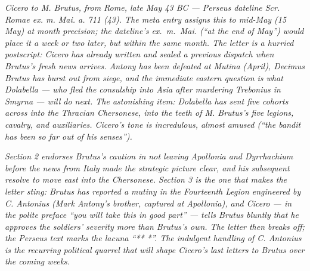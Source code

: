 
\textit{Cicero to M. Brutus, from Rome, late May 43 BC ---
Perseus dateline \textit{Scr. Romae ex. m. Mai. a. 711 (43)}.
The meta entry assigns this to mid-May (15 May) at month
precision; the dateline's \textit{ex.~m.~Mai.} (``at the end
of May'') would place it a week or two later, but within
the same month. The letter is a hurried postscript: Cicero
has already written and sealed a previous dispatch when
Brutus's fresh news arrives. Antony has been defeated at
Mutina (April), Decimus Brutus has burst out from siege,
and the immediate eastern question is what Dolabella ---
who fled the consulship into Asia after murdering Trebonius
in Smyrna --- will do next. The astonishing item: Dolabella
has sent five cohorts across into the Thracian Chersonese,
into the teeth of M. Brutus's five legions, cavalry, and
auxiliaries. Cicero's tone is incredulous, almost amused
(``the bandit has been so far out of his senses'').}

\textit{Section 2 endorses Brutus's caution in not leaving
Apollonia and Dyrrhachium before the news from Italy made
the strategic picture clear, and his subsequent resolve to
move east into the Chersonese. Section 3 is the one that
makes the letter sting: Brutus has reported a mutiny in
the Fourteenth Legion engineered by C. Antonius (Mark
Antony's brother, captured at Apollonia), and Cicero ---
in the polite preface ``you will take this in good part''
--- tells Brutus bluntly that he approves the soldiers'
severity more than Brutus's own. The letter then breaks
off; the Perseus text marks the lacuna ``** *''. The
indulgent handling of C. Antonius is the recurring
political quarrel that will shape Cicero's last letters
to Brutus over the coming weeks.}
